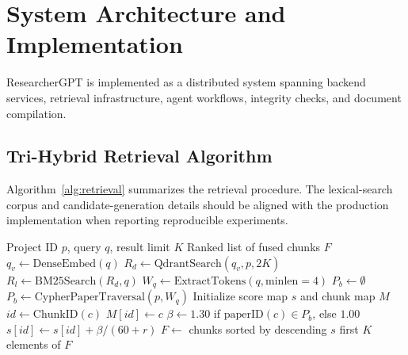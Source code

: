 \documentclass[conference]{IEEEtran}
\begin{document}
\section{System Architecture and Implementation}
ResearcherGPT is implemented as a distributed system spanning backend services, retrieval infrastructure, agent workflows, integrity checks, and document compilation.
\subsection{Tri-Hybrid Retrieval Algorithm}
Algorithm~\ref{alg:retrieval} summarizes the retrieval procedure. The lexical-search corpus and candidate-generation details should be aligned with the production implementation when reporting reproducible experiments.
\begin{algorithm}[!t]
\caption{Tri-Hybrid RRF Retrieval with Knowledge-Graph Boosting}
\label{alg:retrieval}
\begin{algorithmic}[1]
\Require Project ID $p$, query $q$, result limit $K$
\Ensure Ranked list of fused chunks $F$
\State $q_v\gets\mathrm{DenseEmbed}(q)$
\State $R_d\gets\mathrm{QdrantSearch}(q_v,p,2K)$
\State $R_l\gets\mathrm{BM25Search}(R_d,q)$
\State $W_q\gets\mathrm{ExtractTokens}(q,\mathrm{minlen}=4)$
\State $P_b\gets\emptyset$
\State $P_b\gets\mathrm{CypherPaperTraversal}(p,W_q)$
\EndIf
\State Initialize score map $s$ and chunk map $M$
\State $id\gets\mathrm{ChunkID}(c)$
\State $M[id]\gets c$
\State $\beta\gets 1.30$ if $\mathrm{paperID}(c)\in P_b$, else $1.00$
\State $s[id]\gets s[id]+\beta/(60+r)$
\EndFor
\EndFor
\State $F\gets$ chunks sorted by descending $s$
\State \Return first $K$ elements of $F$
\end{algorithmic}
\end{algorithm}
\end{document}
